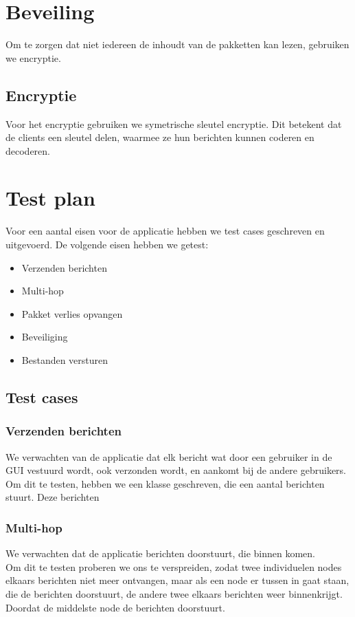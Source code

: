 \documentclass{article}
\begin{document}
\section{Beveiling}
Om te zorgen dat niet iedereen de inhoudt van de pakketten kan lezen, gebruiken we encryptie. 

\subsection{Encryptie}
Voor het encryptie gebruiken we symetrische sleutel encryptie. Dit betekent dat de clients een sleutel delen, waarmee ze hun berichten kunnen coderen en decoderen. 

\section{Test plan}
Voor een aantal eisen voor de applicatie hebben we test cases geschreven en uitgevoerd. De volgende eisen hebben we getest:
\begin{itemize}
\item Verzenden berichten
\item Multi-hop
\item Pakket verlies opvangen
\item Beveiliging
\item Bestanden versturen
\end{itemize}

\subsection{Test cases}
\subsubsection{Verzenden berichten}
We verwachten van de applicatie dat elk bericht wat door een gebruiker in de GUI vestuurd wordt, ook verzonden wordt, en aankomt bij de andere gebruikers. \\
Om dit te testen, hebben we een klasse geschreven, die een aantal berichten stuurt. Deze berichten 
\subsubsection{Multi-hop}
We verwachten dat de applicatie berichten doorstuurt, die binnen komen. \\
Om dit te testen proberen we ons te verspreiden, zodat twee individuelen nodes elkaars berichten niet meer ontvangen, maar als een node er tussen in gaat staan, die de berichten doorstuurt, de andere twee elkaars berichten weer binnenkrijgt. Doordat de middelste node de berichten doorstuurt. \\
\end{document}
